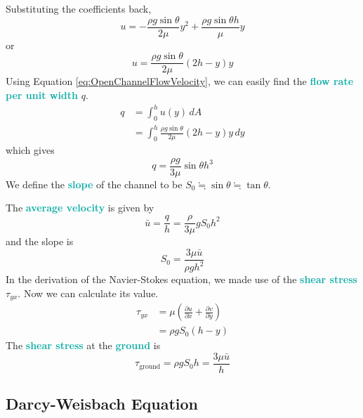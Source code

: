 \documentclass[twoside]{article}
\newcommand{\highlightbluetext}[1]{\textcolor[HTML]{09ACA6}{\textbf{#1}}}
\numberwithin{equation}{section}
\begin{document}
	Substituting the coefficients back,
	\begin{equation*}
		u = -\frac{\rho g \sin \theta}{2\mu} y^2+\frac{\rho g \sin \theta h}{\mu} y
	\end{equation*}
	or
	\begin{equation}
		u = \frac{\rho g \sin \theta}{2\mu} (2h-y)y
		\label{eq:OpenChannelFlowVelocity}
	\end{equation}
	Using Equation \ref{eq:OpenChannelFlowVelocity}, we can easily find the \highlightbluetext{flow rate per unit width} $q$.
	\begin{align*}
		q &= \int_0^h u(y) \, dA \\
		  &= \int_0^h \frac{\rho g \sin \theta}{2\mu} (2h-y)y \, dy
	\end{align*}
	which gives
	\begin{equation}
		q = \frac{\rho g}{3\mu} \sin \theta h^3
		\label{eq:OpenChannelFlowRate}
	\end{equation}
	We define the \highlightbluetext{slope} of the channel to be $S_0 \fallingdotseq \sin \theta \fallingdotseq \tan \theta$.
	
	The \highlightbluetext{average velocity} is given by
	\begin{equation*}
		\bar{u} = \frac{q}{h} = \frac{\rho}{3\mu} gS_0 h^2
	\end{equation*}
	and the slope is
	\begin{equation*}
		S_0 = \frac{3\mu \bar{u}}{\rho gh^2}
	\end{equation*}
	In the derivation of the Navier-Stokes equation, we made use of the \highlightbluetext{shear stress} $\tau_{yx}$. Now we can calculate its value.
	\begin{align*}
		\tau_{yx} &= \mu \left( \frac{\partial u}{\partial x}+\frac{\partial v}{\partial y} \right) \\
		&= \rho gS_0(h-y)
	\end{align*}
	The \highlightbluetext{shear stress} at the \highlightbluetext{ground} is
	\begin{equation}
		\tau_{\text{ground}} = \rho gS_0 h = \frac{3\mu \bar{u}}{h}
		\label{eq:OpenChannelShearStress}
	\end{equation}
	
	\subsection{Darcy-Weisbach Equation}
	\label{subsec:DarcyWeisbachEquation}
	
\end{document}
